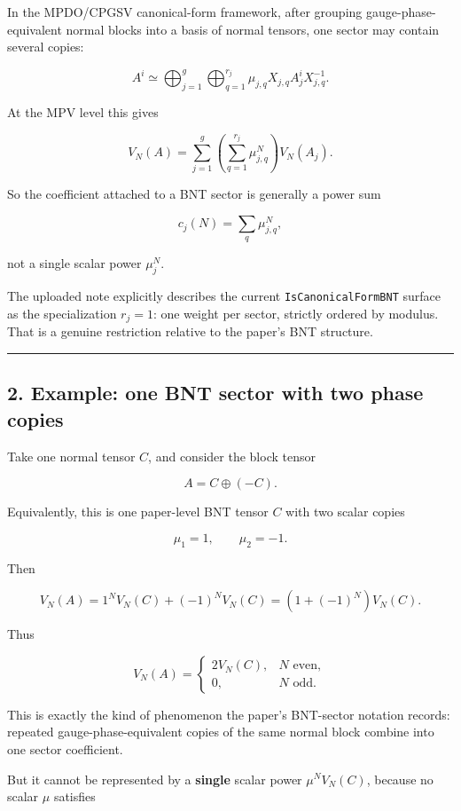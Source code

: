 \documentclass[
  11pt,
]{article}
\begin{document}
In the MPDO/CPGSV canonical-form framework, after grouping
gauge-phase-equivalent normal blocks into a basis of normal tensors, one
sector may contain several copies:

\[
A^i \simeq
\bigoplus_{j=1}^g
\bigoplus_{q=1}^{r_j}
\mu_{j,q} X_{j,q} A_j^i X_{j,q}^{-1}.
\]

At the MPV level this gives

\[
V_N(A)
=
\sum_{j=1}^g
\left(\sum_{q=1}^{r_j}\mu_{j,q}^N\right)V_N(A_j).
\]

So the coefficient attached to a BNT sector is generally a power sum

\[
c_j(N)=\sum_q \mu_{j,q}^N,
\]

not a single scalar power \(\mu_j^N\).

The uploaded note explicitly describes the current
\texttt{IsCanonicalFormBNT} surface as the specialization \(r_j=1\): one
weight per sector, strictly ordered by modulus. That is a genuine
restriction relative to the paper's BNT structure.

\begin{center}\rule{0.5\linewidth}{0.5pt}\end{center}

\subsection{2. Example: one BNT sector with two phase
copies}\label{example-one-bnt-sector-with-two-phase-copies}

Take one normal tensor \(C\), and consider the block tensor

\[
A = C \oplus (-C).
\]

Equivalently, this is one paper-level BNT tensor \(C\) with two scalar
copies

\[
\mu_1=1,\qquad \mu_2=-1.
\]

Then

\[
V_N(A)=1^N V_N(C)+(-1)^N V_N(C)
      =(1+(-1)^N)V_N(C).
\]

Thus

\[
V_N(A)=
\begin{cases}
2V_N(C), & N\text{ even},\\
0, & N\text{ odd}.
\end{cases}
\]

This is exactly the kind of phenomenon the paper's BNT-sector notation
records: repeated gauge-phase-equivalent copies of the same normal block
combine into one sector coefficient.

But it cannot be represented by a \textbf{single} scalar power
\(\mu^N V_N(C)\), because no scalar \(\mu\) satisfies
\end{document}
